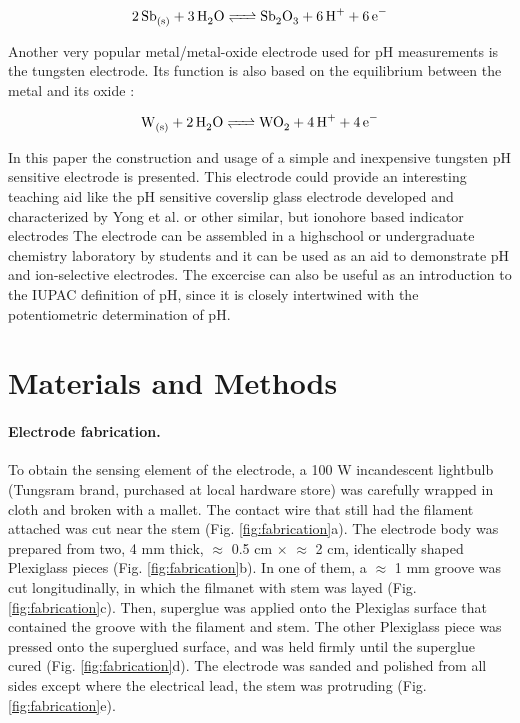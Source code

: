 \documentclass[manuscript=article, journal=jceda8]{achemso}
\begin{document}
\begin{equation}
        \ce{2Sb_{(s)} + 3H_2O <=> Sb_2O_3 + 6H^+ + 6e^-}
\end{equation}

Another very popular metal/metal-oxide electrode used for pH measurements is the tungsten electrode. Its function is also based on the equilibrium between the metal and its oxide \cite{kriksunov1994tungsten}:

\begin{equation}
        \ce{W_{(s)} + 2H_2O <=> WO_2 + 4H^+ + 4e^-}
\end{equation}

In this paper the construction and usage of a simple and inexpensive tungsten pH sensitive electrode is presented. This electrode could provide an interesting teaching aid like the pH sensitive coverslip glass electrode developed and characterized by Yong et al. \cite{yong2019simple} or other similar, but ionohore based indicator electrodes \cite{goldcamp2010inexpensive, marafie2007plastic}
The electrode can be assembled in a highschool or undergraduate chemistry laboratory by students and it can be used as an aid to demonstrate pH and ion-selective electrodes. The excercise can also be useful as an introduction to the IUPAC definition of pH, since it is closely intertwined with the potentiometric determination of pH.


\section{Materials and Methods}
\paragraph{Electrode fabrication.}

To obtain the sensing element of the electrode, a 100 W incandescent lightbulb (Tungsram brand, purchased at local hardware store) was carefully wrapped in cloth and broken with a mallet. The contact wire that still had the filament attached was cut near the stem (Fig. \ref{fig:fabrication}a). The electrode body was prepared from two, 4 mm thick, $\approx$ 0.5 cm $\times$ $\approx$ 2 cm, identically shaped Plexiglass pieces (Fig. \ref{fig:fabrication}b). In one of them, a $\approx$ 1 mm groove was cut longitudinally, in which the filmanet with stem was layed (Fig. \ref{fig:fabrication}c). Then, superglue was applied onto the Plexiglas surface that contained the groove with the filament and stem. The other Plexiglass piece was pressed onto the superglued surface, and was held firmly until the superglue cured (Fig. \ref{fig:fabrication}d). The electrode was sanded and polished from all sides except where the electrical lead, the stem was protruding (Fig. \ref{fig:fabrication}e).
\end{document}
